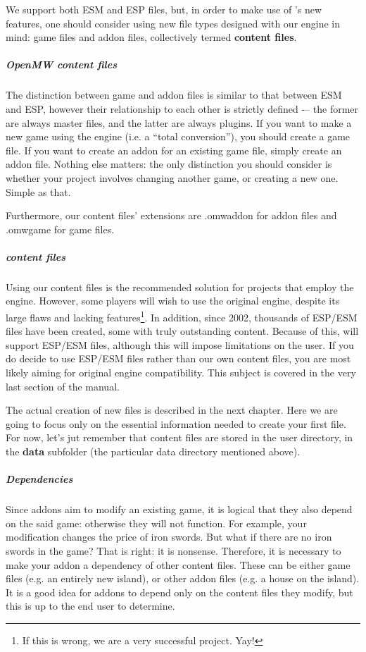 We support both ESM and ESP files, but, in order to make use of \OMW{}'s new features, one should consider using new file types designed
with our engine in mind: game files and addon files, collectively termed \textbf{content files}.

\subparagraph{OpenMW content files}
The distinction between game and addon files is similar to that between ESM and ESP, however their relationship to each other is
strictly defined -– the former are always master files, and the latter are always plugins. If you want to make a new game using the \OMW{}
engine (i.e. a ``total conversion''), you should create a game file. If you want to create an addon for an existing game file, simply
create an addon file. Nothing else matters: the only distinction you should consider is whether your project involves changing another game, 
or creating a new one. Simple as that.

Furthermore, our content files’ extensions are .omwaddon for addon files and .omwgame for game files.

\subparagraph{\MW{} content files}
Using our content files is the recommended solution for projects that employ the \OMW{} engine. However, some players will wish to use 
the original \MW{} engine, despite its large flaws and lacking features\footnote{If this is wrong, we are a very successful project. Yay!}. 
In addition, since 2002, thousands of ESP/ESM files have been created, some with truly outstanding content. Because of this, \OCS{} 
will support ESP/ESM files, although this will impose limitations on the user. If you do decide to use ESP/ESM files rather than our own content 
files, you are most likely aiming for original engine compatibility. This subject is covered in the very last section of the manual. 

The actual creation of new files is described in the next chapter. Here we are going to focus only on the essential information needed
to create your first \OCS{} file. For now, let's jut remember that content files are stored in the user directory, in the \textbf{data}
subfolder (the particular data directory mentioned above).

\subparagraph{Dependencies}
Since addons aim to modify an existing game, it is logical that they also depend on the said game: otherwise they will not function.
For example, your modification changes the price of iron swords. But what if there are no iron swords in the game? That is right:
it is nonsense. Therefore, it is necessary to make your addon a dependency of other content files. These can be either game files
(e.g. an entirely new island), or other addon files (e.g. a house on the island). It is a good idea for addons to depend only on the
content files they modify, but this is up to the end user to determine.


